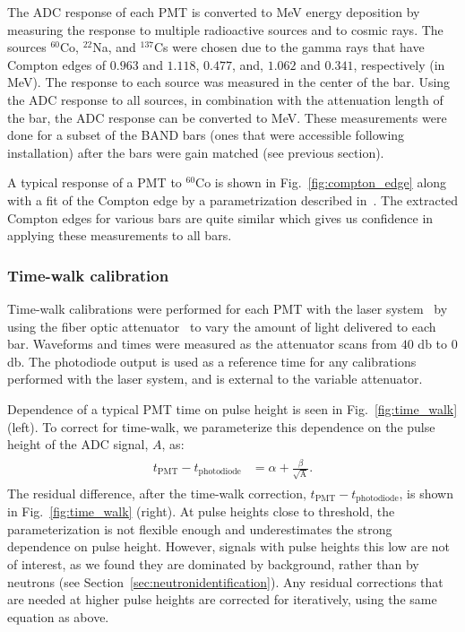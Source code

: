 \documentclass[3p,twocolumn]{elsarticle}
\begin{document}
The ADC response of each PMT is converted to \si{\mega\electronvolt}
energy deposition by measuring the response to multiple radioactive
sources and to cosmic rays. The sources $^{60}$Co, $^{22}$Na, and $^{137}$Cs were chosen due
to the gamma rays that have Compton edges of $0.963$ and $1.118$,
$0.477$, and, $1.062$ and $0.341$, respectively (in
\si{\mega\electronvolt}). The response to each source was measured in
the center of the bar. Using the ADC response to all sources, in
combination with the attenuation length of the bar, the ADC response
can be converted to \si{\mega\electronvolt}. These measurements were
done for a subset of the BAND bars (ones that were accessible following
installation) after the bars were gain matched (see previous section).

A typical response of a PMT to $^{60}$Co is shown in
Fig.~\ref{fig:compton_edge} along with a fit of the Compton edge by a
parametrization described in~\cite{comptonedge}. The extracted Compton edges
for various bars are quite similar which gives us confidence in
applying these measurements to all bars. 

\subsubsection{Time-walk calibration}
Time-walk calibrations were performed for each PMT with the laser system~\cite{band-laser} by using the fiber optic attenuator~\cite{attenuator} to vary
the amount of light delivered to each bar. Waveforms and times were measured as the attenuator scans from $40$ \si{\decibel} to $0$ 
\si{\decibel}. The photodiode output is used as a reference time for any calibrations 
performed with the laser system, and is external to the variable attenuator.

Dependence of a typical PMT time on pulse height is seen in
Fig.~\ref{fig:time_walk} (left). To correct for time-walk, we
parameterize this dependence on the pulse height of the ADC signal, $A$,
as:
\begin{eqnarray}
	\begin{split}
		t_{\mathrm{PMT}}-t_{\mathrm{photodiode}}	&= \alpha + \frac{\beta}{\sqrt{\textrm{A}}}.				
		\label{eqn:time_walk}
	\end{split}
\end{eqnarray}
The residual difference, after the time-walk correction,
$t_{\mathrm{PMT}}-t_{\mathrm{photodiode}}$, is shown in
Fig.~\ref{fig:time_walk} (right). At pulse heights close to threshold,
the parameterization is not flexible enough and underestimates the
strong dependence on pulse height. However, signals with pulse heights
this low are not of interest, as we found they are dominated by background,
rather than by neutrons (see Section~\ref{sec:neutronidentification}). Any residual corrections that are needed at higher pulse heights are corrected for iteratively, using the same equation as above. 
\end{document}
